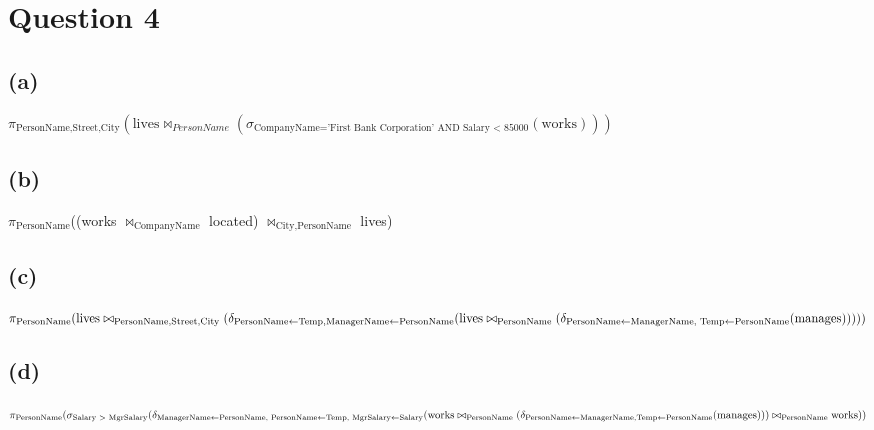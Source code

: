 \documentclass{article}[12pt]
\begin{document}
\newpage
\section*{Question 4}
\subsection*{(a)}
$\pi_{\textrm{PersonName,Street,City}}(\textrm{lives} \bowtie_{PersonName} (\sigma_{\textrm{CompanyName='First Bank Corporation' AND Salary $<$ 85000}}(\textrm{works})))$ \\

\subsection*{(b)}
$\pi_{\textrm{PersonName}}$((works $\bowtie_{\textrm{CompanyName}}$ located) $\bowtie _{\textrm{City,PersonName}}$ lives) \\

\subsection*{(c)}
$\pi_{\textrm{PersonName}}(\textrm{lives} \bowtie_{\textrm{PersonName,Street,City}} (\delta_{\textrm{PersonName} \leftarrow \textrm{Temp}, \textrm{ManagerName} \leftarrow \textrm{PersonName}}(\textrm{lives} \\
\bowtie_{\textrm{PersonName}} (\delta_{\textrm{PersonName} \leftarrow \textrm{ManagerName, Temp} \leftarrow \textrm{PersonName}}(\textrm{manages})))))$ \\

\subsection*{(d)}
$\pi_{\textrm{PersonName}}(\sigma_{\textrm{Salary $>$ MgrSalary}}(\delta_{\textrm{ManagerName} \leftarrow \textrm{PersonName, PersonName} \leftarrow \textrm{Temp, MgrSalary} \leftarrow \textrm{Salary}}(\textrm{works} \\
\bowtie_{\textrm{PersonName}} (\delta_{\textrm{PersonName} \leftarrow \textrm{ManagerName}, \textrm{Temp} \leftarrow \textrm{PersonName}}(\textrm{manages}))) \bowtie_{\textrm{PersonName}} \textrm{works}))$ \\
\end{document}
